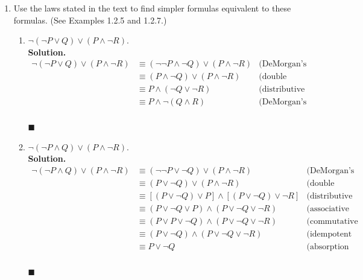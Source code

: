\documentclass{report}
\newcommand{\sol}{\vspace{1em}\\\textbf{Solution.}\vspace{0.5em}}
\newcommand{\qed}{‎\\‎\hfill$\blacksquare$\vspace{1em}}
\begin{document}
\begin{enumerate}[leftmargin=*]
    \item Use the laws stated in the text to find simpler formulas equivalent to these
          formulas. (See Examples 1.2.5 and 1.2.7.)
          \begin{enumerate}
              \item $\neg(\neg P \vee Q) \vee(P \wedge \neg R)$.
                    \sol{}
                    \begin{align*}
                        \neg(\neg P \vee Q) \vee(P \wedge \neg R) & \equiv (\neg\neg P \wedge \neg Q) \vee(P \wedge \neg R) & \text{(DeMorgan's law)}      \\
                                                                  & \equiv (P \wedge \neg Q) \vee(P \wedge \neg R)          & \text{(double negation law)} \\
                                                                  & \equiv P \wedge (\neg Q \vee \neg R)                    & \text{(distributive law)}    \\
                                                                  & \equiv P \wedge \neg(Q \wedge R)                        & \text{(DeMorgan's law)}
                    \end{align*} \qed

              \item $\neg(\neg P \wedge Q) \vee(P \wedge \neg R)$.
                    \sol{}
                    \begin{align*}
                        \neg(\neg P \wedge Q) \vee(P \wedge \neg R) & \equiv (\neg\neg P \vee \neg Q) \vee(P \wedge \neg R)                & \text{(DeMorgan's law)}      \\
                                                                    & \equiv (P \vee \neg Q) \vee(P \wedge \neg R)                         & \text{(double negation law)} \\
                                                                    & \equiv [(P \vee \neg Q) \vee P] \wedge [(P \vee \neg Q) \vee \neg R] & \text{(distributive law)}    \\
                                                                    & \equiv (P \vee \neg Q \vee P) \wedge (P \vee \neg Q \vee \neg R)     & \text{(associative law)}     \\
                                                                    & \equiv (P \vee P \vee \neg Q) \wedge (P \vee \neg Q \vee \neg R)     & \text{(commutative law)}     \\
                                                                    & \equiv (P \vee \neg Q) \wedge (P \vee \neg Q \vee \neg R)            & \text{(idempotent law)}      \\
                                                                    & \equiv P \vee \neg Q                                                 & \text{(absorption law)}
                    \end{align*} \qed


\end{enumerate}
\end{enumerate}
\end{document}
